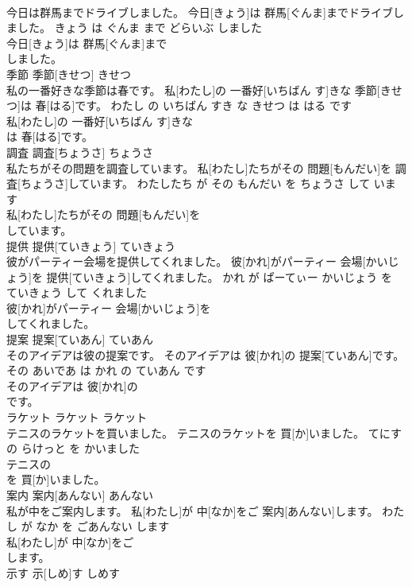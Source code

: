 \documentclass[8pt]{extreport}
\begin{document}
\begin{CJK}{UTF8}{min}
\\	今日は群馬までドライブしました。	今日[きょう]は 群馬[ぐんま]までドライブしました。	きょう は ぐんま まで どらいぶ しました	
\\	今日[きょう]は 群馬[ぐんま]まで
\\	しました。			
\\	季節	季節[きせつ]	きせつ	
\\	私の一番好きな季節は春です。	私[わたし]の 一番好[いちばん す]きな 季節[きせつ]は 春[はる]です。	わたし の いちばん すき な きせつ は はる です	
\\	私[わたし]の 一番好[いちばん す]きな
\\	は 春[はる]です。			
\\	調査	調査[ちょうさ]	ちょうさ	
\\	私たちがその問題を調査しています。	私[わたし]たちがその 問題[もんだい]を 調査[ちょうさ]しています。	わたしたち が その もんだい を ちょうさ して います	
\\	私[わたし]たちがその 問題[もんだい]を
\\	しています。			
\\	提供	提供[ていきょう]	ていきょう	
\\	彼がパーティー会場を提供してくれました。	彼[かれ]がパーティー 会場[かいじょう]を 提供[ていきょう]してくれました。	かれ が ぱーてぃー かいじょう を ていきょう して くれました	
\\	彼[かれ]がパーティー 会場[かいじょう]を
\\	してくれました。			
\\	提案	提案[ていあん]	ていあん	
\\	そのアイデアは彼の提案です。	そのアイデアは 彼[かれ]の 提案[ていあん]です。	その あいであ は かれ の ていあん です	
\\	そのアイデアは 彼[かれ]の
\\	です。			
\\	ラケット	ラケット	ラケット	
\\	テニスのラケットを買いました。	テニスのラケットを 買[か]いました。	てにす の らけっと を かいました	
\\	テニスの
\\	を 買[か]いました。			
\\	案内	案内[あんない]	あんない	
\\	私が中をご案内します。	私[わたし]が 中[なか]をご 案内[あんない]します。	わたし が なか を ごあんない します	
\\	私[わたし]が 中[なか]をご
\\	します。			
\\	示す	示[しめ]す	しめす	

\end{CJK}
\end{document}
